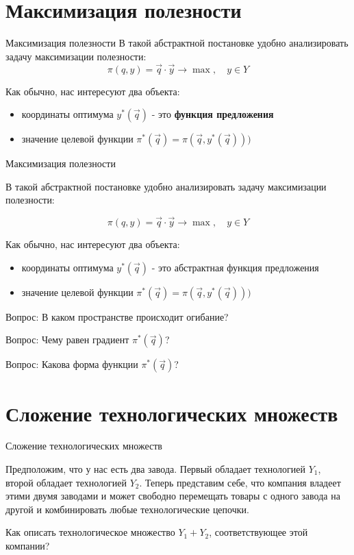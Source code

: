 \documentclass{beamer}
\begin{document}
\section{Максимизация полезности}

\begin{frame}{Максимизация полезности}
В такой абстрактной постановке удобно анализировать задачу максимизации полезности:
$$ \pi(q, y) = \vec q \cdot \vec y \to \max, \quad y \in Y$$

Как обычно, нас интересуют два объекта:

\begin{itemize}
\item координаты оптимума $y^{\ast}(\vec q)$ - это \textbf{функция предложения}
\item значение целевой функции $\pi^{\ast}(\vec q) = \pi(\vec q, y^{\ast}(\vec q)))$
\end{itemize}

\end{frame}

\begin{frame}{Максимизация полезности}

В такой абстрактной постановке удобно анализировать задачу максимизации полезности:

$$ \pi(q, y) = \vec q \cdot \vec y \to \max, \quad y \in Y$$

Как обычно, нас интересуют два объекта:

\begin{itemize}
\item координаты оптимума $y^{\ast}(\vec q)$ - это абстрактная \alert{функция предложения}
\item значение целевой функции $\pi^{\ast}(\vec q) = \pi(\vec q, y^{\ast}(\vec q)))$
\end{itemize}

Вопрос: В каком пространстве происходит огибание?

Вопрос: Чему равен градиент $\pi^{\ast}(\vec q)$?

Вопрос: Какова форма функции $\pi^{\ast}(\vec q)$?

\end{frame}

\section{Сложение технологических множеств}

\begin{frame}{Сложение технологических множеств}

Предположим, что у нас есть два завода. Первый обладает технологией $Y_1$, второй обладает технологией $Y_2$. Теперь представим себе, что компания владеет этими двумя заводами и может свободно перемещать товары с одного завода на другой и комбинировать любые технологические цепочки. 

Как описать технологическое множество $Y_1 + Y_2$, соответствующее этой компании?

\end{frame}
\end{document}
